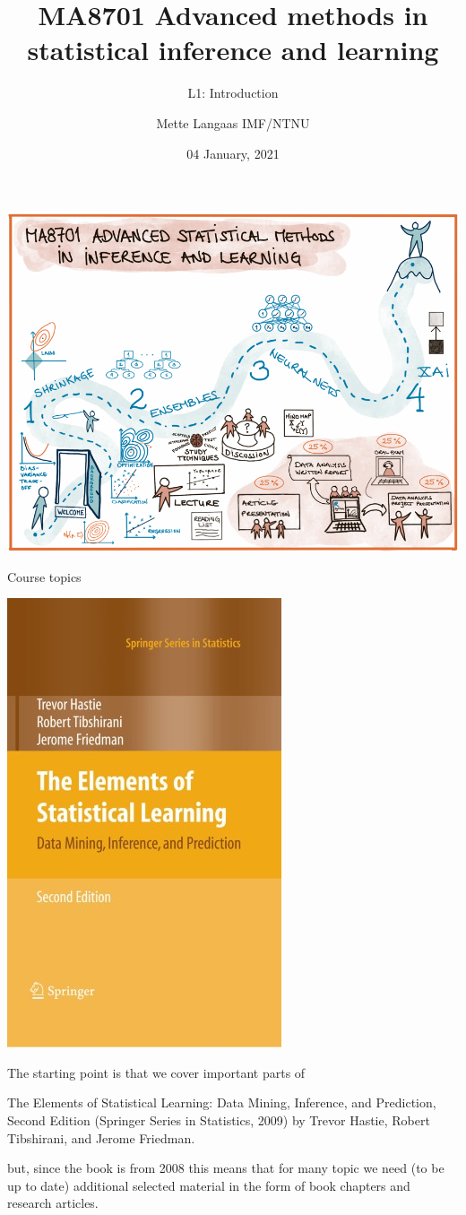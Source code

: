 \documentclass[
  ignorenonframetext,
]{beamer}
\title{MA8701 Advanced methods in statistical inference and learning}
\subtitle{L1: Introduction}
\author{Mette Langaas IMF/NTNU}
\date{04 January, 2021}
\begin{document}
\frame{\titlepage}

\begin{frame}

\includegraphics{./overviewv1.png}

\end{frame}

\begin{frame}{Course topics}
\protect\hypertarget{course-topics}{}

\begin{flushleft}\includegraphics[width=0.2\linewidth]{ELSbookcover} \end{flushleft}

The starting point is that we cover important parts of

The Elements of Statistical Learning: Data Mining, Inference, and
Prediction, Second Edition (Springer Series in Statistics, 2009) by
Trevor Hastie, Robert Tibshirani, and Jerome Friedman.

but, since the book is from 2008 this means that for many topic we need
(to be up to date) additional selected material in the form of book
chapters and research articles.

\end{frame}
\end{document}
